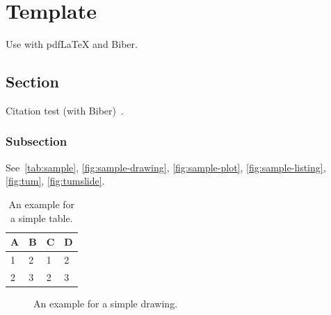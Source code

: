 
\chapter{Template}\label{chapter:template}
Use with pdfLaTeX and Biber.

\section{Section}
Citation test (with Biber)~\parencite{latex}.

\subsection{Subsection}

See~\autoref{tab:sample}, \autoref{fig:sample-drawing}, \autoref{fig:sample-plot}, \autoref{fig:sample-listing}, \autoref{fig:tum}, \autoref{fig:tumslide}.

\begin{table}[htpb]
    \caption[Example table]{An example for a simple table.}\label{tab:sample}
    \centering
    \begin{tabular}{l l l l}
        \toprule
        A & B & C & D \\
        \midrule
        1 & 2 & 1 & 2 \\
        2 & 3 & 2 & 3 \\
        \bottomrule
    \end{tabular}
\end{table}

\begin{figure}[htpb]
    \centering
    \caption[Example drawing]{An example for a simple drawing.}\label{fig:sample-drawing}
\end{figure}

